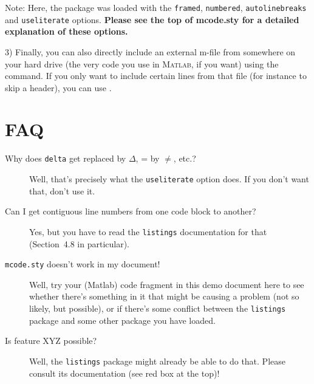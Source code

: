 \documentclass{article}
\begin{document}
Note: Here, the package was loaded with the \verb|framed|, \verb|numbered|, \verb|autolinebreaks| and \verb|useliterate| options.  \textbf{Please see the top of mcode.sty for a detailed explanation of these options.}


3) Finally, you can also directly include an external m-file from somewhere on your hard drive (the very code you use in \textsc{Matlab}, if you want) using the \verb|| command.  If you only want to include certain lines from that file (for instance to skip a header), you can use \verb||.

\section*{FAQ}

\begin{description}
	\item[Why does {\tt delta} get replaced by $\Delta$, {\selectfont\texttildelow=} by $\neq$, etc.?]
		Well, that's precisely what the \verb|useliterate| option does. If you don't want that, don't use it.
	\item[Can I get contiguous line numbers from one code block to another?]
		Yes, but you have to read the \verb|listings| documentation for that (Section~4.8 in particular).
	\item[{\tt mcode.sty} doesn't work in my document!] Well, try your (Matlab) code fragment in this demo document here to see whether there's something in it that might be causing a problem (not so likely, but possible), or if there's some conflict between the \verb|listings| package and some other package you have loaded.
	\item[Is feature XYZ possible?] Well, the \verb|listings| package might already be able to do that. Please consult its documentation (see red box at the top)!
\end{description}
\end{document}
